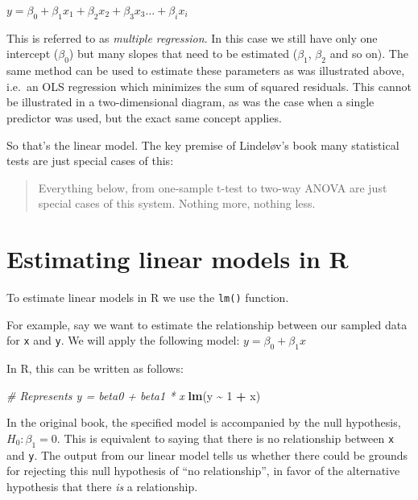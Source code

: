 \documentclass[
  12pt,
]{krantz}
\newenvironment{Shaded}{\begin{snugshade}}{\end{snugshade}}
\newcommand{\CommentTok}[1]{\textcolor[rgb]{0.56,0.35,0.01}{\textit{#1}}}
\newcommand{\DecValTok}[1]{\textcolor[rgb]{0.00,0.00,0.81}{#1}}
\newcommand{\KeywordTok}[1]{\textcolor[rgb]{0.13,0.29,0.53}{\textbf{#1}}}
\newcommand{\NormalTok}[1]{#1}
\newcommand{\OperatorTok}[1]{\textcolor[rgb]{0.81,0.36,0.00}{\textbf{#1}}}
\newcommand{\StringTok}[1]{\textcolor[rgb]{0.31,0.60,0.02}{#1}}
\begin{document}
\begin{center}

\(y = \beta_0 + \beta_1 x_1 + \beta_2 x_2 + \beta_3 x_3 ... + \beta_i x_i\)

\end{center}

This is referred to as \emph{multiple regression}. In this case we still have only one intercept (\(\beta_0\)) but many slopes that need to be estimated (\(\beta_1\), \(\beta_2\) and so on). The same method can be used to estimate these parameters as was illustrated above, i.e.~an OLS regression which minimizes the sum of squared residuals. This cannot be illustrated in a two-dimensional diagram, as was the case when a single predictor was used, but the exact same concept applies.

So that's the linear model. The key premise of Lindeløv's book many statistical tests are just special cases of this:

\begin{quote}
Everything below, from one-sample t-test to two-way ANOVA are just special cases of this system. Nothing more, nothing less.
\end{quote}

\hypertarget{estimating-linear-models-in-r}{%
\section{Estimating linear models in R}\label{estimating-linear-models-in-r}}

To estimate linear models in R we use the \texttt{lm()} function.

For example, say we want to estimate the relationship between our sampled data for \texttt{x} and \texttt{y}. We will apply the following model: \(y = \beta_0 + \beta_1 x\)

In R, this can be written as follows:

\begin{Shaded}
\begin{Highlighting}[]
\CommentTok{\# Represents y = beta0 + beta1 * x}
\KeywordTok{lm}\NormalTok{(y }\OperatorTok{\textasciitilde{}}\StringTok{ }\DecValTok{1} \OperatorTok{+}\StringTok{ }\NormalTok{x)}
\end{Highlighting}
\end{Shaded}

In the original book, the specified model is accompanied by the null hypothesis, \(H_0: \beta_1 = 0\). This is equivalent to saying that there is no relationship between \texttt{x} and \texttt{y}. The output from our linear model tells us whether there could be grounds for rejecting this null hypothesis of ``no relationship'', in favor of the alternative hypothesis that there \emph{is} a relationship.
\end{document}

